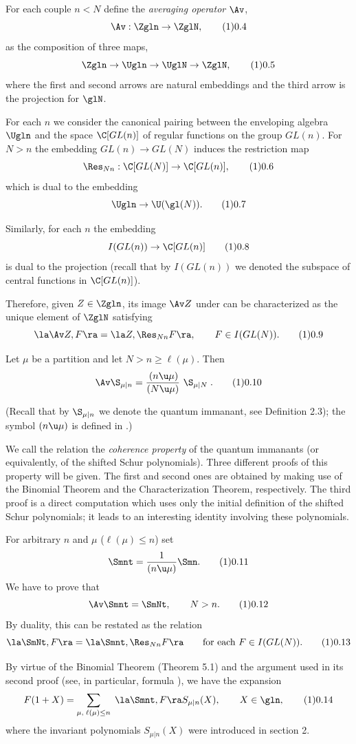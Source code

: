 For each couple $n<N$ define the {\it averaging operator\/} $\Av$,
$$
\Av: \Zgln\to\ZglN,\tag10.4
$$
as the composition of three maps,
$$
\Zgln\to\Ugln\to\UglN\to\ZglN,\tag10.5
$$
where the first and second arrows are natural embeddings and the third
arrow is the projection  for $\glN$. 

For each $n$ we consider the canonical pairing  between the
enveloping algebra $\Ugln$ and the space $\C[GL(n)]$ of regular functions
on the group $GL(n)$. For $N>n$ the embedding $GL(n)\to GL(N)$ induces 
the restriction map
$$
\Res_{Nn}: \C[GL(N)]\to \C[GL(n)], \tag10.6
$$
which is dual to the embedding 
$$
\Ugln\to \U(\gl(N)). \tag10.7
$$

Similarly, for each $n$ the embedding
$$
I(GL(n))\to \C[GL(n)] \tag10.8
$$
is dual to the projection  (recall that by $I(GL(n))$ we denoted the
subspace of central functions in $\C[GL(n)]$).

Therefore, given $Z\in\Zgln$, its image $\Av Z$ under  can be
characterized as the unique element of $\ZglN$ satisfying
$$
\la\Av Z ,F \ra = 
\la Z, \Res_{Nn} F \ra,\qquad F\in I(GL(N)).  \tag10.9
$$

 Let $\mu$ be a partition
and let $N>n\ge\ell(\mu)$. Then
$$
\Av \S_{\mu|n} = \frac{\,(n\u \mu)}{(N\u \mu)} \,\, \S_{\mu|N}\;.\tag10.10
$$
\endproclaim

(Recall that by $\S_{\mu|n}$ we denote the quantum immanant, see
Definition 2.3); the symbol $(n\u\mu)$ is defined in .)

We call the relation  the {\it coherence property} of the quantum
immanants (or equivalently, of the shifted Schur polynomials). Three
different proofs of this property will be given. The first and second ones
are obtained by making use of the Binomial Theorem and the
Characterization Theorem, respectively. The third proof is a direct
computation which uses only the initial definition  of the shifted
Schur polynomials; it leads to an interesting identity involving these
polynomials.  

 For arbitrary $n$ and $\mu$ ($\ell(\mu)\le n$) set
$$
\Smnt=\frac 1{(n\u\mu)}\Smn.\tag10.11
$$
We have to prove that
$$
\Av\Smnt=\SmNt, \qquad N>n.\tag10.12
$$
By duality, this can be restated as the relation
$$
\la\SmNt,F\ra=\la\Smnt,\Res_{Nn}F\ra\qquad
\text{for each $F\in I(GL(N))$.}\tag10.13
$$ 

By virtue of the Binomial Theorem (Theorem 5.1) 
and the argument used in its second
proof (see, in particular, formula  ), we have the expansion
$$
F(1+X)=\sum_{\mu,\;\ell(\mu)\le n}\; 
\la\Smnt,F\ra S_{\mu|n}(X),\qquad X\in\gln,\tag10.14
$$
where the invariant polynomials $S_{\mu|n}(X)$ were introduced in section 2. 

